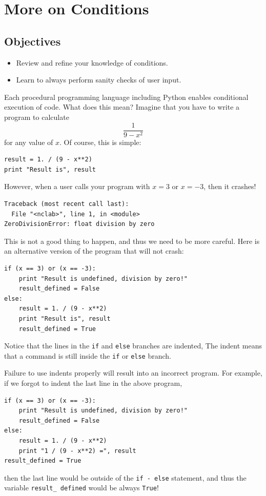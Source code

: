 \section{More on Conditions}

\subsection{Objectives}

\begin{itemize}
\item Review and refine your knowledge of conditions.
\item Learn to always perform sanity checks of user input.
\end{itemize}
Each procedural programming language including Python enables conditional 
execution of code. What does this mean? Imagine that you have to write
a program to calculate
$$
\frac{1}{9 - x^2}
$$
for any value of $x$. Of course, this is simple:

\begin{verbatim}
result = 1. / (9 - x**2)
print "Result is", result
\end{verbatim}
However, when a user calls your program with $x = 3$ or $x = -3$, then
it crashes!

\begin{verbatim}
Traceback (most recent call last):
  File "<nclab>", line 1, in <module>
ZeroDivisionError: float division by zero
\end{verbatim}
This is not a good thing to happen, and thus we need to be more careful.
Here is an alternative version of the program that will not crash:

\begin{verbatim}
if (x == 3) or (x == -3):
    print "Result is undefined, division by zero!"
    result_defined = False
else:
    result = 1. / (9 - x**2)
    print "Result is", result
    result_defined = True
\end{verbatim}
Notice that the lines in the {\tt if} and {\tt else} branches are indented,
The indent means that a command is still inside the {\tt if} or {\tt else}
branch.

Failure to use indents properly will result into an incorrect program. For 
example, if we forgot to indent the last line in the above program,

\begin{verbatim}
if (x == 3) or (x == -3):
    print "Result is undefined, division by zero!"
    result_defined = False
else:
    result = 1. / (9 - x**2)
    print "1 / (9 - x**2) =", result
result_defined = True
\end{verbatim}
then the last line would be outside of the {\tt if - else} statement, and
thus the variable {\tt result\_ defined} would be always {\tt True}!\\

